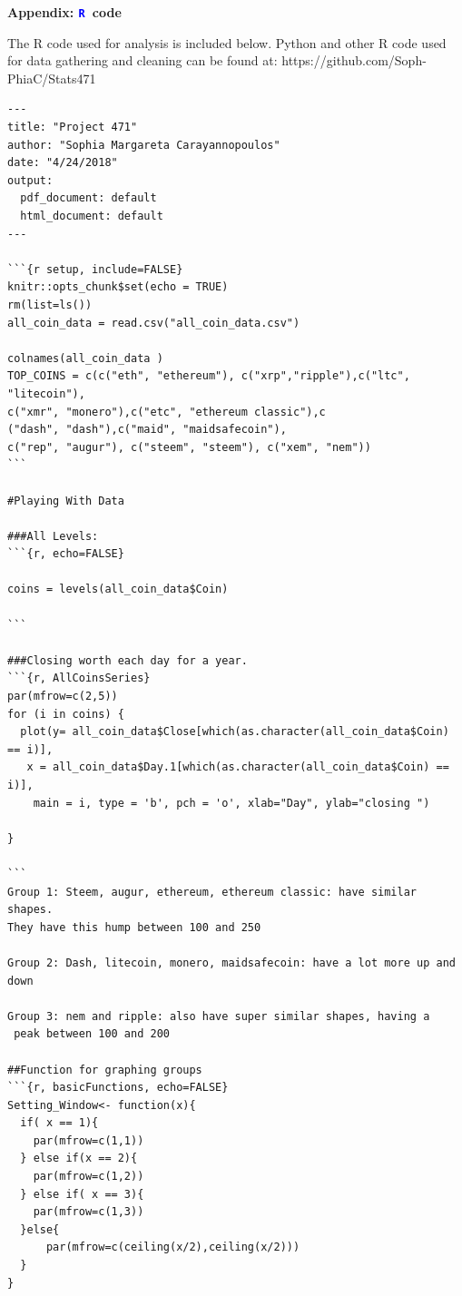 \documentclass[12pt]{article}
\newcommand{\textR}[1]{\textcolor{blue}{\texttt{#1}}}
\newcommand{\R}{\textR{R}}
\begin{document}
\newpage

\appendix
\sloppy
\begin{center}
\sloppy

{\Large {\bf Appendix: \R\ code}}
\end{center}
The R code used for analysis is included below. Python and other R code used for data gathering and cleaning can be found at:
https://github.com/Soph-PhiaC/Stats471

{\footnotesize 

\begin{verbatim} 
---
title: "Project 471"
author: "Sophia Margareta Carayannopoulos"
date: "4/24/2018"
output:
  pdf_document: default
  html_document: default
---

```{r setup, include=FALSE}
knitr::opts_chunk$set(echo = TRUE)
rm(list=ls())
all_coin_data = read.csv("all_coin_data.csv")

colnames(all_coin_data )
TOP_COINS = c(c("eth", "ethereum"), c("xrp","ripple"),c("ltc", "litecoin"),
c("xmr", "monero"),c("etc", "ethereum classic"),c
("dash", "dash"),c("maid", "maidsafecoin"), 
c("rep", "augur"), c("steem", "steem"), c("xem", "nem"))
```

#Playing With Data

###All Levels:
```{r, echo=FALSE}

coins = levels(all_coin_data$Coin)

```

###Closing worth each day for a year.
```{r, AllCoinsSeries}
par(mfrow=c(2,5))
for (i in coins) {
  plot(y= all_coin_data$Close[which(as.character(all_coin_data$Coin) == i)],
   x = all_coin_data$Day.1[which(as.character(all_coin_data$Coin) == i)],
    main = i, type = 'b', pch = 'o', xlab="Day", ylab="closing ")
  
}

```
Group 1: Steem, augur, ethereum, ethereum classic: have similar shapes. 
They have this hump between 100 and 250

Group 2: Dash, litecoin, monero, maidsafecoin: have a lot more up and down

Group 3: nem and ripple: also have super similar shapes, having a
 peak between 100 and 200

##Function for graphing groups
```{r, basicFunctions, echo=FALSE}
Setting_Window<- function(x){
  if( x == 1){
    par(mfrow=c(1,1))
  } else if(x == 2){
    par(mfrow=c(1,2))
  } else if( x == 3){
    par(mfrow=c(1,3))
  }else{
      par(mfrow=c(ceiling(x/2),ceiling(x/2)))
  }
}


\end{verbatim}}
\end{document}
